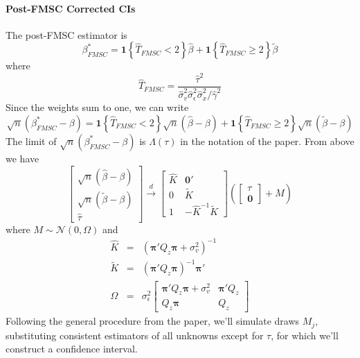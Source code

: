 \documentclass[12pt]{article}
\theoremstyle{definition}
\begin{document}
\paragraph{Post-FMSC Corrected CIs}
The post-FMSC estimator is
  $$\beta^*_{FMSC} = \textbf{1}\left\{\widehat{T}_{FMSC} < 2 \right\} \widehat{\beta} + \textbf{1}\left\{\widehat{T}_{FMSC} \geq 2 \right\} \widetilde{\beta}$$
where
  $$\widehat{T}_{FMSC} = \frac{\widehat{\tau}^2 }{\widehat{\sigma}_v^2 \widehat{\sigma}_\epsilon^2 \widehat{\sigma}_x^2/\widehat{\gamma}^2}$$    
Since the weights sum to one, we can write
  $$\sqrt{n}(\beta^*_{FMSC} - \beta) = \textbf{1}\left\{\widehat{T}_{FMSC} < 2 \right\} \sqrt{n}(\widehat{\beta} - \beta) + \textbf{1}\left\{\widehat{T}_{FMSC} \geq 2 \right\}\sqrt{n}( \widetilde{\beta}-\beta)$$
The limit of $\sqrt{n}(\beta^*_{FMSC} - \beta)$ is $\Lambda(\tau)$ in the notation of the paper. From above we have
  $$
\left[
\begin{array}{c}
  \sqrt{n}\left(\widehat{\beta} - \beta\right) \\
  \sqrt{n}\left(\widetilde{\beta} - \beta\right)\\
  \widehat{\tau}
\end{array}
\right] \overset{d}{\rightarrow} 
\left[\begin{array}{cc}
\widehat{K} & \mathbf{0}'\\
  0 & \widetilde{K}\\
  1 & -\widehat{K}^{-1} \widetilde{K}
  \end{array}
  \right]\left( \left[\begin{array}{c} \tau \\ \mathbf{0}  \end{array} \right] + M\right)
$$
where $M \sim \mathcal{N}(0, \Omega)$ and
  \begin{eqnarray}
 \widehat{K}&=&   \left(\boldsymbol{\pi}'Q_z \boldsymbol{\pi} + \sigma_v^2\right)^{-1}\\
    \widetilde{K} &=& \left(\boldsymbol{\pi}'Q_z \boldsymbol{\pi}\right)^{-1}\boldsymbol{\pi}'\\
    \Omega &=& \sigma_\epsilon^2\left[ \begin{array}{cc}
\boldsymbol{\pi}'Q_z \boldsymbol{\pi}  +\sigma^2_v 
&\boldsymbol{\pi}'Q_z\\
  Q_z \boldsymbol{\pi}&Q_z
  \end{array}\right]
  \end{eqnarray}
Following the general procedure from the paper, we'll simulate draws $M_j$, substituting consistent estimators of all unknowns except for $\tau$, for which we'll construct a confidence interval.
\end{document}
